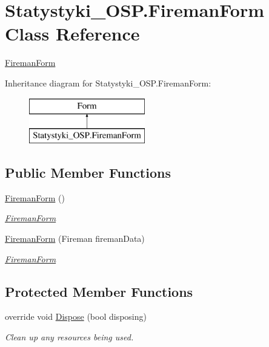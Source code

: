 \hypertarget{class_statystyki___o_s_p_1_1_fireman_form}{}\section{Statystyki\+\_\+\+O\+S\+P.\+Fireman\+Form Class Reference}
\label{class_statystyki___o_s_p_1_1_fireman_form}


\mbox{\hyperlink{class_statystyki___o_s_p_1_1_fireman_form}{Fireman\+Form}}  


Inheritance diagram for Statystyki\+\_\+\+O\+S\+P.\+Fireman\+Form\+:\begin{figure}[H]
\begin{center}
\leavevmode
\includegraphics[height=2.000000cm]{class_statystyki___o_s_p_1_1_fireman_form}
\end{center}
\end{figure}
\subsection*{Public Member Functions}
\begin{DoxyCompactItemize}
\item 
\mbox{\hyperlink{class_statystyki___o_s_p_1_1_fireman_form_a312f4597fb08b110a3bbc19f49c377c7}{Fireman\+Form}} ()
\begin{DoxyCompactList}\small\item\em \mbox{\hyperlink{class_statystyki___o_s_p_1_1_fireman_form}{Fireman\+Form}} \end{DoxyCompactList}\item 
\mbox{\hyperlink{class_statystyki___o_s_p_1_1_fireman_form_a774be63ea528569c402651d4f8f7a335}{Fireman\+Form}} (Fireman fireman\+Data)
\begin{DoxyCompactList}\small\item\em \mbox{\hyperlink{class_statystyki___o_s_p_1_1_fireman_form}{Fireman\+Form}} \end{DoxyCompactList}\end{DoxyCompactItemize}
\subsection*{Protected Member Functions}
\begin{DoxyCompactItemize}
\item 
override void \mbox{\hyperlink{class_statystyki___o_s_p_1_1_fireman_form_a651a19a5d290493f52a21df3dbf3fe86}{Dispose}} (bool disposing)
\begin{DoxyCompactList}\small\item\em Clean up any resources being used. \end{DoxyCompactList}\end{DoxyCompactItemize}

